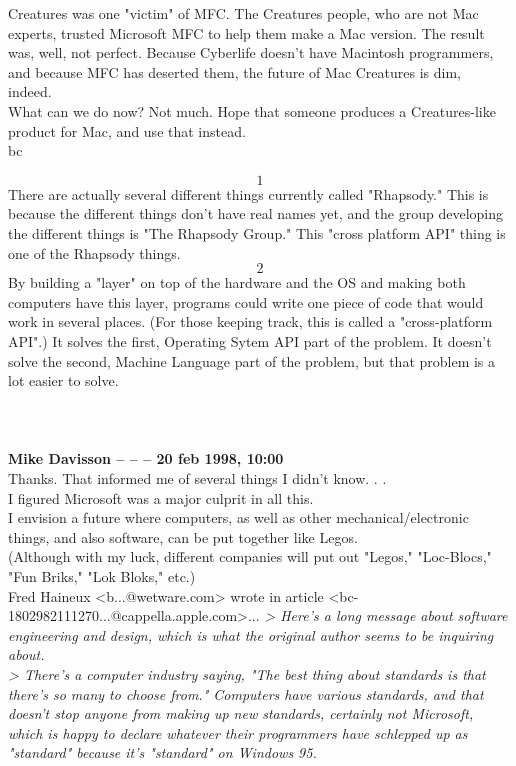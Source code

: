 \documentclass[11pt,twoside,a4paper]{article}
\begin{document}
\begin{multicols*}{2}
Creatures was one "victim" of MFC. The Creatures people, who are not Mac experts, trusted Microsoft MFC to help them make a Mac version. The result was, well, not perfect. Because Cyberlife doesn't have Macintosh programmers, and because MFC has deserted them, the future of Mac Creatures is dim, indeed.~\\

What can we do now? Not much. Hope that someone produces a Creatures-like product for Mac, and use that instead.~\\

bc

\[1\] There are actually several different things currently called "Rhapsody." This is because the different things don't have real names yet, and the group developing the different things is "The Rhapsody Group." This "cross platform API" thing is one of the Rhapsody things.~\\
\[2\]  By building a "layer" on top of the hardware and the OS and making both computers have this layer, programs could write one piece of code that would work in several places. (For those keeping track, this is called a "cross-platform API".) It solves the first, Operating Sytem API part of the problem. It doesn't solve the second, Machine Language part of the problem, but that problem is a lot easier to solve.~\\ 
	
		
~\\ ~\\ ~\\ \textbf{Mike Davisson -- -- -- 20 feb 1998, 10:00}~\\

Thanks.  That informed me of several things I didn't know. . .~\\

I figured Microsoft was a major culprit in all this.~\\

I envision a future where computers, as well as other mechanical/electronic things, and also software, can be put together like Legos.~\\
(Although with my luck, different companies will put out "Legos," "Loc-Blocs," "Fun Briks," "Lok Bloks," etc.)~\\

Fred Haineux <b...@wetware.com> wrote in article <bc-1802982111270...@cappella.apple.com>...
\emph{> Here's a long message about software engineering and design, which is what the original author seems to be inquiring about.}~\\
\emph{> There's a computer industry saying, "The best thing about standards is that there's so many to choose from." Computers have various standards, and that doesn't stop anyone from making up new standards, certainly not Microsoft, which is happy to declare whatever their programmers have schlepped up as "standard" because it's "standard" on Windows 95.}~\\


\end{multicols*}
\end{document}
